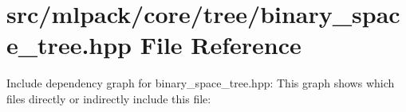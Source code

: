 \section{src/mlpack/core/tree/binary\-\_\-space\-\_\-tree.hpp File Reference}
\label{binary__space__tree_8hpp}
Include dependency graph for binary\-\_\-space\-\_\-tree.\-hpp\-:
This graph shows which files directly or indirectly include this file\-:
